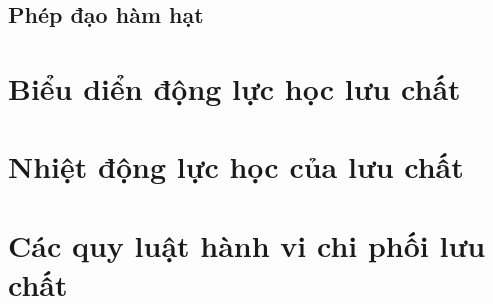 \documentclass[../../main.tex]{subfiles}
\begin{document}
	\subsection{Phép đạo hàm hạt}
		
\section{Biểu diển động lực học lưu chất}
	
\section{Nhiệt động lực học của lưu chất}
	
\section{Các quy luật hành vi chi phối lưu chất}
	
\end{document}
